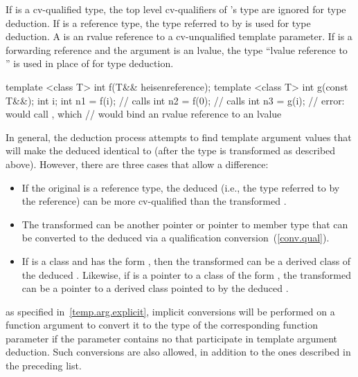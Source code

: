 \pnum
{}%
If
is a cv-qualified type, the top level cv-qualifiers of
's
type are ignored for type deduction.
If
is a reference type, the type
referred to by
is used for type deduction.
A 
is an rvalue reference to a cv-unqualified template parameter.
If  is a forwarding reference and the argument is an
lvalue, the type ``lvalue reference to '' is used in place of  for type
deduction. \enterexample
\begin{codeblock}
template <class T> int f(T&& heisenreference);
template <class T> int g(const T&&);
int i;
int n1 = f(i);                  // calls 
int n2 = f(0);                  // calls 
int n3 = g(i);                  // error: would call , which
                                // would bind an rvalue reference to an lvalue
\end{codeblock}
\exitexample

\pnum
In general, the deduction process attempts to find template argument
values that will make the deduced
identical to
(after
the type
is transformed as described above).
However, there are
three cases that allow a difference:

\begin{itemize}
\item
If the original
is a reference type, the deduced
(i.e.,
the type referred to by the reference) can be more cv-qualified than
the transformed .
\item
The transformed 
can be another pointer or pointer to member type that can be converted
to the deduced
via a qualification conversion~(\ref{conv.qual}).

\item
If
is a class and
has the form
,
then
the transformed 
can be a derived class of the
deduced
.
Likewise, if
is a pointer to a class of the form
,
the transformed 
can be a pointer to a
derived class pointed to by the deduced
.
\end{itemize}

\enternote as specified in~\ref{temp.arg.explicit}, implicit conversions will be
performed on a function argument to convert it to the type of the corresponding
function parameter if the parameter contains no 
that participate in template argument deduction. Such conversions are also
allowed, in addition to the ones described in the preceding list. \exitnote

